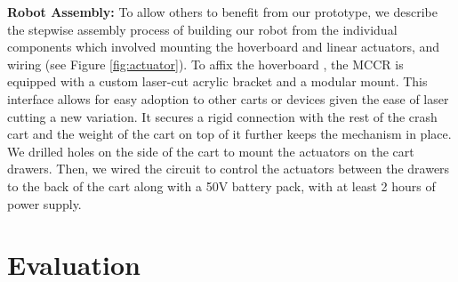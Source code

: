 \begin{comment}
\begin{figure}[t] 
\centering 
\texttt{[image: figures/Actuator\_v3.png]} 
\caption{We built two linear actuator casing prototypes. The case for the first prototype pushed the actuator back when it opened so we built a more stable casing to hold it in place.} 
\label{fig:actuator}
\end{figure}


 \begin{figure}[t] 
	\centering 
	\texttt{[image: figures/assembly\_v1.png]} 
	\caption{Prototype 2 assembly of hardware components.} 
	\label{fig:assembly} 
\end{figure}
\end{comment}

\textbf{Robot Assembly:} To allow others to benefit from our prototype, we describe the stepwise assembly process of building our robot from the individual components which involved mounting the hoverboard and linear actuators, and wiring (see Figure \ref{fig:actuator}). 
To affix the hoverboard \cite{mandel2023recapturing}, the MCCR is equipped with a custom laser-cut acrylic bracket and a modular mount. 
This interface allows for easy adoption to other carts or devices given the ease of laser cutting a new variation. 
It secures a rigid connection with the rest of the crash cart and the weight of the cart on top of it further keeps the mechanism in place.
We drilled holes on the side of the cart to mount the actuators on the cart drawers. 
Then, we wired the circuit to control the actuators between the drawers to the back of the cart along with a 50V battery pack, with at least 2 hours of power supply.


 






\section{Evaluation}


